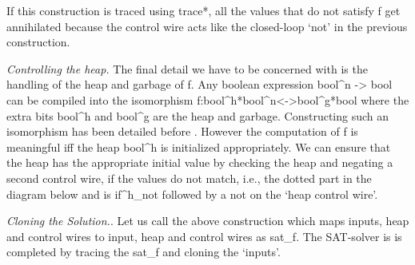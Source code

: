 \documentclass[preprint]{sigplanconf}
\newcommand{\xcomment}[2]{\textbf{#1:~\textsl{#2}}}
\newcommand{\roshan}[1]{\xcomment{Roshan}{#1}}
\begin{document}
\begin{center}
\end{center}  

If this construction is traced using {{trace*}}, all the values that
do not satisfy {{f}} get annihilated because the control wire acts
like the closed-loop `not' in the previous construction. 

\emph{Controlling the heap.}  The final detail we have to be concerned
with is the handling of the heap and garbage of {{f}}. Any boolean
expression {{bool^n -> bool}} can be compiled into the isomorphism
{{f:bool^h*bool^n<->bool^g*bool}} where the extra bits {{bool^h}} and
{{bool^g}} are the heap and garbage. Constructing such an isomorphism
has been detailed before \cite{Toffoli:1980,infeffects}.  However the
computation of {{f}} is meaningful {{iff}} the heap {{bool^h}} is
initialized appropriately. We can ensure that the heap has the
appropriate initial value by checking the heap and negating a second
control wire, if the values do not match, i.e., the dotted part in
the diagram below and is {{if^h_{not} }} followed by a {{not}} on the
`heap control wire'.

\begin{center}
\end{center}  


\emph{Cloning the Solution.}.  Let us call the above construction
which maps inputs, heap and control wires to input, heap and control
wires as {{sat_f}}. The SAT-solver is is completed by tracing the
{{sat_f}} and cloning the `inputs'. 

\begin{center}
\end{center}  
\end{document}
